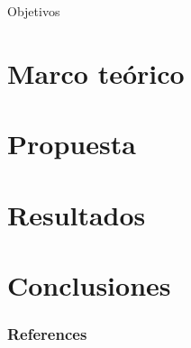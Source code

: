\documentclass[10pt]{beamer}
\newcommand{\1}{
        	\setbeamertemplate{background}{
        		\texttt{[image: img/1]}
        		\tikz[overlay] \fill[fill opacity=0.75,fill=white] (0,0) rectangle (-\paperwidth,\paperheight);
        	}
}
\begin{document}
\begin{frame}{Objetivos}{}
	
\end{frame}




\section{Marco teórico}



\section{Propuesta}

\section{Resultados}


\section{Conclusiones}

\begin{frame}[allowframebreaks]
	\frametitle{References}
	
	
\end{frame}
\end{document}
